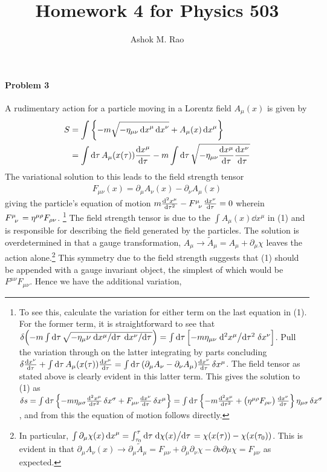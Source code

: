 \documentclass[10pt]{scrartcl}
\title{Homework 4 for Physics  503}
\author{Ashok M. Rao}
\begin{document}
\maketitle




\paragraph{Problem 3}

A rudimentary action for a particle moving in a Lorentz field $A_{\mu}(x)$ is given by
\begin{align}
S &= \int \left\{-m\sqrt{-\eta_{\mu\nu}\dd{x}^\mu\dd{x}^\nu}+A_{\mu}(x)\dd{x}^\mu \right\}\\ &= \int \dd{\tau} A_{\mu}(x(\tau))\dv{x^\mu}{\tau} - m\int\dd{\tau}\sqrt{-\eta_{\mu\nu}\dv{x^\mu}{\tau}\dv{x^{\nu}}{\tau}} 
\end{align} 
The variational solution to this leads to the field strength tensor 
\begin{align*}
	F_{\mu\nu}(x)= \partial_\mu A_\nu(x) - \partial_\nu A_\mu (x)
\end{align*}
giving the particle's equation of motion $m\dv[2]{x^{\mu}}{\tau}-\tensor{F}{^\mu_\nu}\dv{x^{\nu}}{\tau} = 0	$ wherein $\tensor{F}{^\mu_\nu} =\eta^{\mu\rho}F_{\rho\nu}$. \footnote{ 
To see this, calculate the variation for either term on the last equation in (1). For the former term, it is straightforward to see that $\var(-m\int \dd{\tau}\sqrt{-\eta_{\mu}{\nu}\dv*{x^\mu}{\tau}\dv*{x^{\nu}}{\tau}}) = \int\dd{\tau}\left[-m \eta_{\mu\nu}\dv*[2]{x^{\mu}}{\tau}\var{x^\nu}\right]$. Pull the variation through on the latter integrating by parts concluding $\var{\dv{x^{\nu}}{\tau} + \int \dd{\tau}A_{\mu}(x(\tau))\dv{x^\mu}{\tau}}=\int \dd{\tau}(\partial_\mu A_\nu - \partial_\nu A_\mu)\dv{x^{\nu}}{\tau}\var{x^{\mu}}$. The field tensor as stated above is clearly evident in this latter term. This gives the solution to (1) as $\var{s} = \int \dd{\tau}\left\{-m\eta_{\mu\sigma}\dv[2]{x^{\mu}}{\tau}\var{x^{\sigma}} + F_{\mu\nu}\dv{x^{\nu}}{\tau}\var{x^{\mu}}\right\} = \int \dd{\tau}\left\{-m\dv[2]{x^{\mu}}{\tau} + \left(\eta^{\mu\rho}F_{\rho\nu}\right)\dv{x^{\nu}}{\tau}\right\}\eta_{\mu\sigma}\var{x^{\sigma}}$, and from this the equation of motion follows directly.}  The field strength tensor is due to the $\int A_{\mu}(x)\dd{x}^\mu$ in (1) and is responsible for describing the field generated by the particles. The solution is overdetermined in that a gauge transformation, $A_\mu \rightarrow \tilde{A}_{\mu}= A_\mu + \partial_\mu \chi$ leaves the action alone.\footnote{In particular, $\int \partial_\mu \chi(x)\dd{x}^\mu = \int_{\tau_0}^{\tau} \dd{\tau}\dv*{\chi(x)}{\tau} = \chi(x(\tau))-\chi(x(\tau_0))$. This is evident in that $\partial_\mu A_\nu(x) \rightarrow\partial_\mu\tilde{A}_{\mu} = F_{\mu\nu} + \partial_\mu\partial_\nu \chi - \partial\nu\partial\mu\chi = F_{\mu\nu}$ as expected.}  This symmetry due to the field strength suggests that (1) should be appended with a gauge invariant object, the simplest of which would be $F^{\mu\nu}F_{\mu\nu}$. Hence we have the additional variation,
\end{document}
